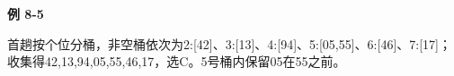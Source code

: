 {\color{ink}\bfseries 例 8-5}\par\vspace{1bp}首趟按个位分桶，非空桶依次为2:[42]、3:[13]、4:[94]、5:[05,\allowbreak{}55]、6:[46]、7:[17]；收集得42,\allowbreak{}13,\allowbreak{}94,\allowbreak{}05,\allowbreak{}55,\allowbreak{}46,\allowbreak{}17，选C。5号桶内保留05在55之前。
